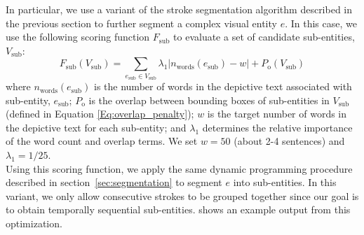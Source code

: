 In particular, we use a variant of the stroke segmentation algorithm described in the previous section to further segment a complex visual entity $e$.
%
In this case, we use the following scoring function $F_\text{sub}$ to evaluate a set of candidate sub-entities, $V_\text{sub}$:
%
\begin{equation} F_\text{sub}(V_\text{sub}) = \sum_{e_\text{sub} \in V_\text{sub}}\lambda_{1}\lvert n_\text{words}(e_\text{sub}) - w \rvert + P_\text{o}(V_\text{sub}) \end{equation} 
%
where $n_\text{words}(e_\text{sub})$ is the number of words in the depictive text associated with sub-entity, $e_\text{sub}$; $P_\text{o}$ is the overlap between bounding boxes of sub-entities in $V_\text{sub}$ (defined in Equation \ref{Eq:overlap_penalty}); $w$ is the target number of words in the depictive text for each sub-entity; and $\lambda_{1}$ determines the relative importance of the word count and overlap terms. We set $w = 50$ (about 2-4 sentences) and $\lambda_{1} = 1/25$.\\

Using this scoring function, we apply the same dynamic programming procedure described in section~\ref{sec:segmentation} to segment $e$ into sub-entities. In this variant, we only allow consecutive strokes to be grouped together since our goal is to obtain temporally sequential sub-entities.
%
 shows an example output from this optimization.  
